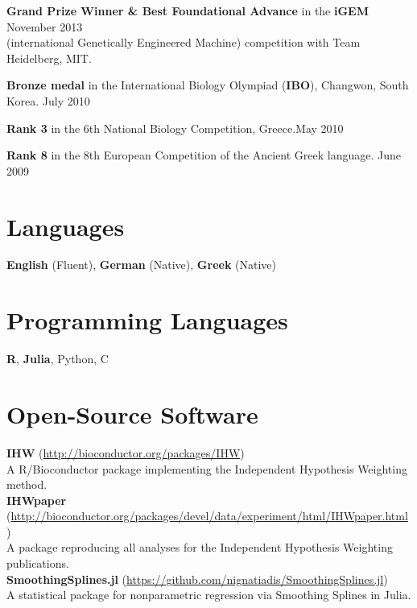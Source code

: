 \documentclass[margin,line]{res}
\newcommand{\ver}{\vspace*{-2.7mm}}
\begin{document}
\begin{resume}
\textbf{Grand Prize Winner \& Best Foundational Advance} in the \textbf{iGEM} \hfill November 2013 \\
(international Genetically Engineered Machine) competition with Team Heidelberg, MIT.

\ver
\textbf{Bronze medal} in the International Biology Olympiad (\textbf{IBO}), Changwon, South Korea. \hfill July 2010

\ver
\textbf{Rank 3} in the 6th National Biology Competition, Greece.\hfill May 2010
\ver

\textbf{Rank 8} in the 8th European Competition of the Ancient Greek language. \hfill June 2009




\section{\sc Languages}
\textbf{English} (Fluent), \textbf{German} (Native), \textbf{Greek} (Native)


\section{\sc Programming Languages}
\textbf{R}, \textbf{Julia}, Python, C


\section{\sc Open-Source Software}
\textbf{IHW} (\url{http://bioconductor.org/packages/IHW})\\ A R/Bioconductor package implementing the Independent Hypothesis Weighting method. \\
\textbf{IHWpaper} (\url{http://bioconductor.org/packages/devel/data/experiment/html/IHWpaper.html})\\
A package reproducing all analyses for the Independent Hypothesis Weighting publications.\\
\textbf{SmoothingSplines.jl} (\url{https://github.com/nignatiadis/SmoothingSplines.jl})\\
A statistical package for nonparametric regression via Smoothing Splines in Julia.

\end{resume}
\end{document}
